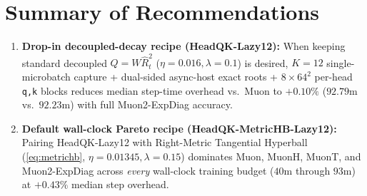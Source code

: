 \documentclass[11pt]{article}
\newcommand{\mname}[1]{#1}
\begin{document}
\FloatBarrier
\section{Summary of Recommendations}
\label{sec:conclusion}

\begin{enumerate}
  \item \textbf{Drop-in decoupled-decay recipe (\mname{HeadQK-Lazy12}):} When keeping standard decoupled $Q = W\hat{R}_t^2$ ($\eta = 0.016, \lambda = 0.1$) is desired, $K = 12$ single-microbatch capture + dual-sided async-host exact roots + $8\times 64^2$ per-head \texttt{q,k} blocks reduces median step-time overhead vs.\ \mname{Muon} to $+0.10\%$ ($92.79\text{m}$ vs.\ $92.23\text{m}$) with full \mname{Muon2-ExpDiag} accuracy.
  \item \textbf{Default wall-clock Pareto recipe (\mname{HeadQK-MetricHB-Lazy12}):} Pairing \mname{HeadQK-Lazy12} with Right-Metric Tangential Hyperball (\cref{eq:metrichb}, $\eta = 0.01345, \lambda = 0.15$) dominates \mname{Muon}, \mname{MuonH}, \mname{MuonT}, and \mname{Muon2-ExpDiag} across \emph{every} wall-clock training budget ($40\text{m}$ through $93\text{m}$) at $+0.43\%$ median step overhead.
\end{enumerate}
\end{document}
